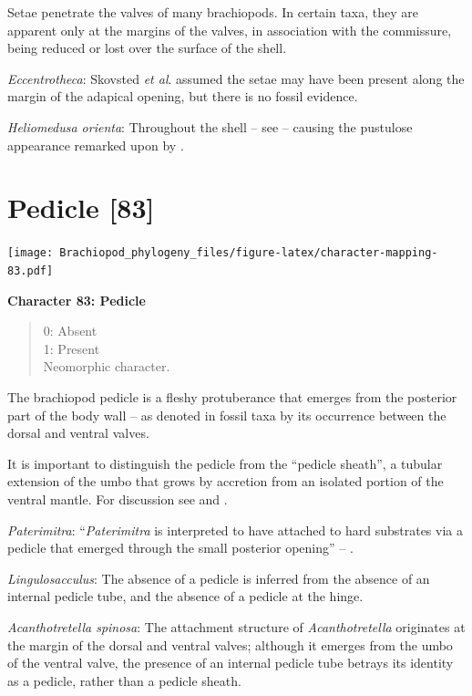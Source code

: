 \documentclass[openany]{book}
\theoremstyle{definition}
\theoremstyle{definition}
\theoremstyle{definition}
\theoremstyle{remark}
\begin{document}
Setae penetrate the valves of many brachiopods. In certain taxa, they
are apparent only at the margins of the valves, in association with the
commissure, being reduced or lost over the surface of the shell.

\emph{Eccentrotheca}: Skovsted \emph{et al}.
\citeyearpar{Skovsted2011Scleritomeconstruction} assumed the setae may
have been present along the margin of the adapical opening, but there is
no fossil evidence.

\emph{Heliomedusa orienta}: Throughout the shell -- see
\citet{Williams2007PartH} -- causing the pustulose appearance remarked
upon by \citet{Chen2007Reinterpretationof}.

\hypertarget{pedicle-83}{%
\section{Pedicle {[}83{]}}\label{pedicle-83}}

\texttt{[image: Brachiopod\_phylogeny\_files/figure-latex/character-mapping-83.pdf]}

\textbf{Character 83: Pedicle}

\begin{quote}
0: Absent\\
1: Present\\
Neomorphic character.
\end{quote}

The brachiopod pedicle is a fleshy protuberance that emerges from the
posterior part of the body wall -- as denoted in fossil taxa by its
occurrence between the dorsal and ventral valves.

It is important to distinguish the pedicle from the ``pedicle sheath'',
a tubular extension of the umbo that grows by accretion from an isolated
portion of the ventral mantle. For discussion see
\citet{Holmer2018Theattachment} and \citet{Bassett2017Earliestontogeny}.

\emph{Paterimitra}: ``\emph{Paterimitra} is interpreted to have attached
to hard substrates via a pedicle that emerged through the small
posterior opening'' -- \citet{Skovsted2009Thescleritome}.

\emph{Lingulosacculus}: The absence of a pedicle is inferred from the
absence of an internal pedicle tube, and the absence of a pedicle at the
hinge.

\emph{Acanthotretella spinosa}: The attachment structure of
\emph{Acanthotretella} originates at the margin of the dorsal and
ventral valves; although it emerges from the umbo of the ventral valve,
the presence of an internal pedicle tube betrays its identity as a
pedicle, rather than a pedicle sheath.
\end{document}
